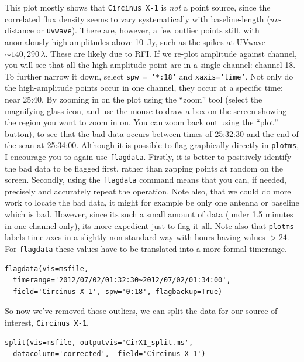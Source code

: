 \documentclass[force,almostfull,justified]{tufte-book}
\begin{document}
This plot mostly shows that {\tt Circinus X-1} is {\em not} a point source, since the correlated flux
density seems to vary systematically with baseline-length ($uv$-distance or {\tt uvwave}).  There are,
however, a few outlier points still, with anomalously high amplitudes above 10~Jy, such as the spikes
at UVwave $\sim 140, 290 \, \lambda$.  These are likely due to RFI\@.  If we re-plot amplitude against
channel, you will see that all the high amplitude point are in a single channel: channel 18.  To
further narrow it down, select {\tt spw = '*:18'} and {\tt xaxis='time'}.  Not only do the
high-amplitude points occur in one channel, they occur at a specific time: near 25:40.  By zooming in
on the plot using the ``zoom'' tool (select the magnifying glass icon, and use the mouse to draw a box
on the screen showing the region you want to zoom in on.  You can zoom back out using the ``plot''
button), to see that the bad data occurs between times of 25:32:30 and the end of the scan at
25:34:00.  Although it is possible to flag graphically directly in {\tt plotms}, I encourage you to
again use {\tt flagdata}.  Firstly, it is better to positively identify the bad data to be flagged
first, rather than zapping points at random on the screen.  Secondly, using the {\tt flagdata} command
means that you can, if needed, precisely and accurately repeat the operation.  Note also, that we
could do more work to locate the bad data, it might for example be only one antenna or baseline which
is bad.  However, since its such a small amount of data (under 1.5 minutes in one channel only), its
more expedient just to flag it all.  Note also that {\tt plotms} labels time axes in a slightly
non-standard way with hours having values $>24$.  For {\tt flagdata} these values have to be
translated into a more formal timerange.

\begin{casacmd}
\begin{verbatim}
flagdata(vis=msfile,
  timerange='2012/07/02/01:32:30~2012/07/02/01:34:00',
  field='Circinus X-1', spw='0:18', flagbackup=True)
\end{verbatim}
\end{casacmd}

So now we've removed those outliers, we can split the data for our source of interest, {\tt Circinus
X-1}.

\begin{casacmd}
\begin{verbatim}
split(vis=msfile, outputvis='CirX1_split.ms',
  datacolumn='corrected',  field='Circinus X-1')
\end{verbatim}
\end{casacmd}
\end{document}
